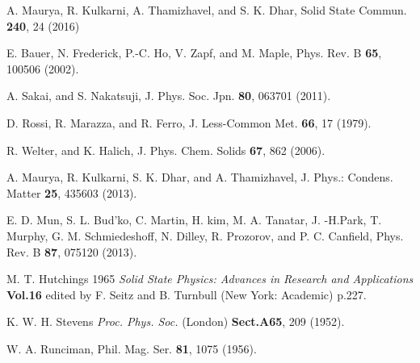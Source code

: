\documentclass[preprint,showpacs,preprintnumbers,amsmath,amssymb, prb]{revtex4}
\begin{document}
\begin{thebibliography}{99}

A. Maurya, R. Kulkarni, A. Thamizhavel, and S. K. Dhar, Solid State Commun. {\bf 240}, 24 (2016)

E. Bauer, N. Frederick, P.-C. Ho, V. Zapf, and M. Maple, Phys. Rev. B {\bf 65}, 100506 (2002).

 A. Sakai, and S. Nakatsuji, J. Phys. Soc. Jpn. {\bf 80}, 063701 (2011).

D. Rossi, R. Marazza, and R. Ferro, J. Less-Common Met. {\bf 66}, 17 (1979).

 R. Welter, and K. Halich, J. Phys. Chem. Solids {\bf 67}, 862 (2006).

A. Maurya, R. Kulkarni, S. K. Dhar, and A. Thamizhavel, J. Phys.: Condens. Matter {\bf 25}, 435603 (2013).

E. D. Mun, S. L. Bud'ko, C. Martin, H. kim, M. A. Tanatar, J. -H.Park, T. Murphy, G. M. Schmiedeshoff, N. Dilley, R. Prozorov, and P. C. Canfield, Phys. Rev. B {\bf 87}, 075120 (2013).

 M. T. Hutchings 1965 \textit{Solid State Physics: Advances in Research and Applications} \textbf{Vol.16} edited by F. Seitz and B. Turnbull (New York: Academic) p.227.

 K. W. H. Stevens  \textit{Proc. Phys. Soc.} (London)  \textbf{Sect.A65}, 209 (1952).

 W. A. Runciman, Phil. Mag. Ser. {\bf 81}, 1075 (1956).

\end{thebibliography}
\end{document}

